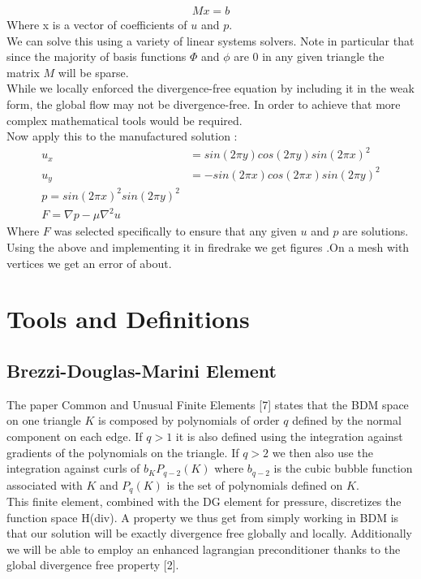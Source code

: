 \documentclass[11pt,twoside,a4paper]{article}
\begin{document}
\begin{align}
M x = b
\end{align}
Where x is a vector of coefficients of $u$ and $p$.\\
We can solve this using a variety of linear systems solvers. Note in particular that since the majority of basis functions $\Phi$ and $\phi$ are $0$ in any given triangle the matrix $M$ will be sparse.\\
While we locally enforced the divergence-free equation by including it in the weak form, the global flow may not be divergence-free. In order to achieve that more complex mathematical tools would be required.\\
Now apply this to the manufactured solution :
\begin{align*}
u_x &=  sin(2 \pi y) cos(2 \pi y)  sin(2 \pi x)^2 \\
u_y &= -sin(2 \pi x) cos(2 \pi x)  sin(2 \pi y)^2 \\
p = sin(2 \pi x)^2 sin(2 \pi y)^2 \\
F = \nabla p - \mu \nabla^2 u
\end{align*}
Where $F$ was selected specifically to ensure that any given $u$ and $p$ are solutions.
Using the above and implementing it in firedrake we get figures .On a mesh with vertices we get an error of about.

\section{Tools and Definitions}
\subsection{Brezzi-Douglas-Marini Element}
The paper Common and Unusual Finite Elements [7] states that the BDM space on one triangle $K$ is composed by polynomials of order $q$ defined by the normal component on each edge. If $q > 1$ it is also defined using the integration against gradients of the polynomials on the triangle. If $q > 2$ we then also use the integration  against curls of $b_K P_{q-2}(K)$ where $b_{q-2}$ is the  cubic bubble function associated with $K$ and $P_{q}(K)$ is the set of polynomials defined on $K$.\\
This finite element, combined with the DG element for pressure, discretizes the function space H(div). A property we thus get from simply working in BDM is that our solution will be exactly divergence free globally and locally.
Additionally we will be able to employ an enhanced lagrangian preconditioner thanks to the global divergence free property [2].\\
\end{document}

